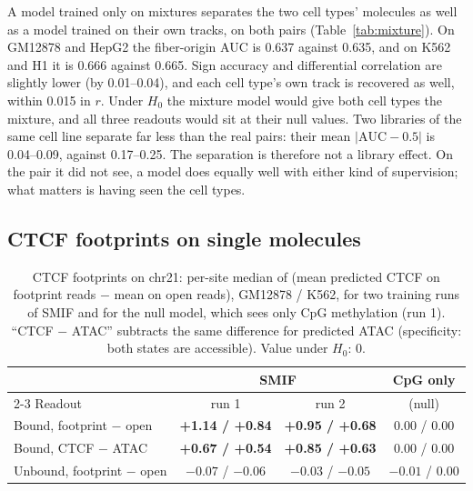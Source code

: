 \documentclass[acmtog,nonacm]{acmart}   %
\begin{document}
A model trained only on mixtures separates the two cell types' molecules as well as a model trained on their own
tracks, on both pairs (Table~\ref{tab:mixture}). On GM12878 and HepG2 the fiber-origin AUC is 0.637 against 0.635,
and on K562 and H1 it is 0.666 against 0.665. Sign accuracy and differential correlation are slightly lower (by 0.01--0.04), and
each cell type's own track is recovered as well, within 0.015 in $r$. Under $H_0$ the mixture model would give both
cell types the mixture, and all three readouts would sit at their null values. Two libraries of the same cell line
separate far less than the real pairs: their mean $|\mathrm{AUC}-0.5|$ is 0.04--0.09, against 0.17--0.25. The
separation is therefore not a library effect. On the pair it did not see, a model does equally well with either kind of supervision; what matters
is having seen the cell types.

\subsection{CTCF footprints on single molecules}
\label{sec:res-ctcf}

\begin{table}[t]
\caption{CTCF footprints on chr21: per-site median of (mean predicted CTCF on footprint reads $-$ mean on open
reads), GM12878 / K562, for two training runs of SMIF and for the null model, which sees only CpG methylation
(run 1). ``CTCF $-$ ATAC'' subtracts the same difference for predicted ATAC (specificity: both states are
accessible). Value under $H_0$: 0.}
\label{tab:ctcf}
\footnotesize
\begin{tabular}{@{}lccc@{}}
\toprule
& \multicolumn{2}{c}{SMIF} & CpG only \\
\cmidrule(lr){2-3}
Readout & run 1 & run 2 & (null) \\
\midrule
Bound, footprint $-$ open & \textbf{+1.14 / +0.84} & \textbf{+0.95 / +0.68} & 0.00 / 0.00 \\
Bound, CTCF $-$ ATAC & \textbf{+0.67 / +0.54} & \textbf{+0.85 / +0.63} & 0.00 / 0.00 \\
Unbound, footprint $-$ open & $-0.07$ / $-0.06$ & $-0.03$ / $-0.05$ & $-0.01$ / 0.00 \\
\bottomrule
\end{tabular}
\end{table}
\end{document}
